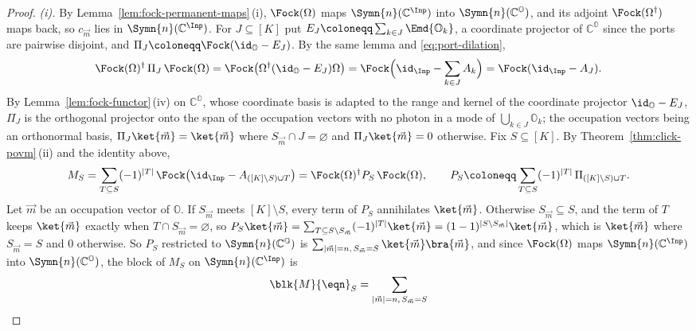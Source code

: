 \begin{proof}
\emph{(i).} By Lemma~\ref{lem:fock-permanent-maps}\,(i), $\Fock(\Omega)$ maps
$\Symn{n}(\mathbb{C}^{\Inp})$ into $\Symn{n}(\mathbb{C}^{\mathbb{O}})$, and its
adjoint $\Fock(\Omega^{\dagger})$ maps back, so $c_{\vec m}$ lies in
$\Symn{n}(\mathbb{C}^{\Inp})$. For $J\subseteq[K]$ put
$E_J\coloneqq\sum_{k\in J}\Emd{\mathbb{O}_k}$, a coordinate projector of
$\mathbb{C}^{\mathbb{O}}$ since the ports are pairwise disjoint, and
$\Pi_J\coloneqq\Fock(\id_{\mathbb{O}}-E_J)$. By the same lemma and
\eqref{eq:port-dilation},
\begin{equation*}
  \Fock(\Omega)^{\dagger}\,\Pi_J\,\Fock(\Omega)
  =\Fock\big(\Omega^{\dagger}(\id_{\mathbb{O}}-E_J)\Omega\big)
  =\Fock\Big(\id_{\Inp}-\sum_{k\in J}A_k\Big)
  =\Fock(\id_{\Inp}-A_J).
\end{equation*}
By Lemma~\ref{lem:fock-functor}\,(iv) on $\mathbb{C}^{\mathbb{O}}$, whose
coordinate basis is adapted to the range and kernel of the coordinate
projector $\id_{\mathbb{O}}-E_J$, $\Pi_J$ is the orthogonal projector onto the
span of the occupation vectors with no photon in a mode of
$\bigcup_{k\in J}\mathbb{O}_k$; the occupation vectors being an orthonormal
basis, $\Pi_J\ket{\vec m}=\ket{\vec m}$ where $S_{\vec m}\cap J=\varnothing$
and $\Pi_J\ket{\vec m}=0$ otherwise. Fix $S\subseteq[K]$. By
Theorem~\ref{thm:click-povm}\,(ii) and the identity above,
\begin{equation*}
  M_S=\sum_{T\subseteq S}(-1)^{|T|}\,
      \Fock\big(\id_{\Inp}-A_{([K]\setminus S)\cup T}\big)
  =\Fock(\Omega)^{\dagger}P_S\,\Fock(\Omega),
  \qquad
  P_S\coloneqq\sum_{T\subseteq S}(-1)^{|T|}\,\Pi_{([K]\setminus S)\cup T}.
\end{equation*}
Let $\vec m$ be an occupation vector of $\mathbb{O}$. If $S_{\vec m}$ meets
$[K]\setminus S$, every term of $P_S$ annihilates $\ket{\vec m}$. Otherwise
$S_{\vec m}\subseteq S$, and the term of $T$ keeps $\ket{\vec m}$ exactly
when $T\cap S_{\vec m}=\varnothing$, so
$P_S\ket{\vec m}=\sum_{T\subseteq S\setminus S_{\vec m}}(-1)^{|T|}\ket{\vec m}
=(1-1)^{|S\setminus S_{\vec m}|}\ket{\vec m}$, which is $\ket{\vec m}$ where
$S_{\vec m}=S$ and $0$ otherwise. So $P_S$ restricted to
$\Symn{n}(\mathbb{C}^{\mathbb{O}})$ is
$\sum_{|\vec m|=n,\,S_{\vec m}=S}\ket{\vec m}\bra{\vec m}$, and since
$\Fock(\Omega)$ maps $\Symn{n}(\mathbb{C}^{\Inp})$ into
$\Symn{n}(\mathbb{C}^{\mathbb{O}})$, the block of $M_S$ on
$\Symn{n}(\mathbb{C}^{\Inp})$ is
\begin{equation*}
  \blk{M}{\eqn}_S=\sum_{|\vec m|=n,\,S_{\vec m}=S}

\end{equation*}
\end{proof}
